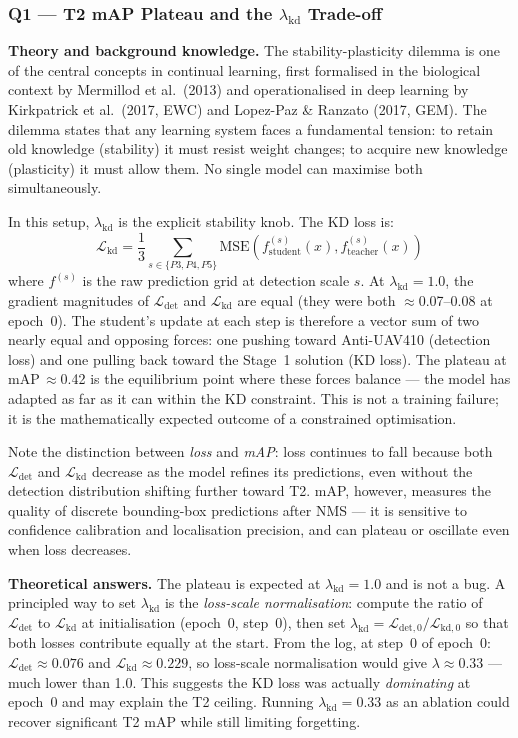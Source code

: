 \subsubsection*{Q1 — T2 mAP Plateau and the $\lambda_{\text{kd}}$ Trade-off}

\textbf{Theory and background knowledge.}
The stability-plasticity dilemma is one of the central concepts in
continual learning, first formalised in the biological context by
Mermillod et al.\ (2013) and operationalised in deep learning by
Kirkpatrick et al.\ (2017, EWC) and Lopez-Paz \& Ranzato (2017,
GEM). The dilemma states that any learning system faces a fundamental
tension: to retain old knowledge (stability) it must resist weight
changes; to acquire new knowledge (plasticity) it must allow them.
No single model can maximise both simultaneously.

In this setup, $\lambda_{\text{kd}}$ is the explicit stability knob.
The KD loss is:
\[
    \mathcal{L}_{\text{kd}} = \frac{1}{3} \sum_{s \in \{P3,P4,P5\}}
    \text{MSE}(f_{\text{student}}^{(s)}(x), f_{\text{teacher}}^{(s)}(x))
\]
where $f^{(s)}$ is the raw prediction grid at detection scale $s$.
At $\lambda_{\text{kd}}=1.0$, the gradient magnitudes of
$\mathcal{L}_{\text{det}}$ and $\mathcal{L}_{\text{kd}}$ are equal
(they were both $\approx$0.07--0.08 at epoch~0). The student's
update at each step is therefore a vector sum of two nearly equal
and opposing forces: one pushing toward Anti-UAV410 (detection loss)
and one pulling back toward the Stage~1 solution (KD loss). The
plateau at mAP\,$\approx$0.42 is the equilibrium point where these
forces balance --- the model has adapted as far as it can within
the KD constraint. This is not a training failure; it is the
mathematically expected outcome of a constrained optimisation.

Note the distinction between \emph{loss} and \emph{mAP}: loss
continues to fall because both $\mathcal{L}_{\text{det}}$ and
$\mathcal{L}_{\text{kd}}$ decrease as the model refines its
predictions, even without the detection distribution shifting
further toward T2. mAP, however, measures the quality of
discrete bounding-box predictions after NMS --- it is sensitive
to confidence calibration and localisation precision, and can
plateau or oscillate even when loss decreases.

\textbf{Theoretical answers.}
The plateau is expected at $\lambda_{\text{kd}}=1.0$ and is not
a bug. A principled way to set $\lambda_{\text{kd}}$ is the
\emph{loss-scale normalisation}: compute the ratio of
$\mathcal{L}_{\text{det}}$ to $\mathcal{L}_{\text{kd}}$ at
initialisation (epoch~0, step~0), then set
$\lambda_{\text{kd}} = \mathcal{L}_{\text{det},0} /
\mathcal{L}_{\text{kd},0}$ so that both losses contribute equally
at the start. From the log, at step~0 of epoch~0:
$\mathcal{L}_{\text{det}} \approx 0.076$ and
$\mathcal{L}_{\text{kd}} \approx 0.229$, so loss-scale
normalisation would give $\lambda \approx 0.33$ --- much lower
than 1.0. This suggests the KD loss was actually \emph{dominating}
at epoch~0 and may explain the T2 ceiling. Running
$\lambda_{\text{kd}} = 0.33$ as an ablation could recover
significant T2 mAP while still limiting forgetting.

